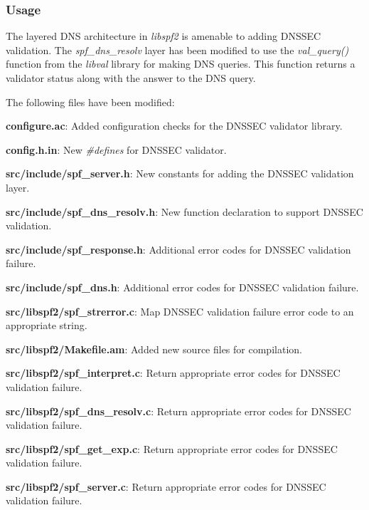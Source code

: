 \documentclass[12pt]{article}
\newcommand{\lib}[1]{{\em #1}}
\newcommand{\path}[1]{{\bf #1}}
\begin{document}

\subsubsection{Usage}

The layered DNS architecture in \lib{libspf2} is amenable to adding DNSSEC
validation.  The {\it spf\_\-dns\_\-resolv} layer has been modified to use
the {\it val\_query()} function from the \lib{libval} library for making
DNS queries.  This function returns a validator status along with the answer
to the DNS query.

The following files have been modified:
\begin{description}
\item{\path{configure.ac}}:
Added configuration checks for the DNSSEC validator library.

\item{\path{config.h.in}}:
New {\it \#defines} for DNSSEC validator.

\item{\path{src/include/spf\_server.h}}:
New constants for adding the DNSSEC validation layer.

\item{\path{src/include/spf\_dns\_resolv.h}}:
New function declaration to support DNSSEC validation.

\item{\path{src/include/spf\_response.h}}:
Additional error codes for DNSSEC validation failure.

\item{\path{src/include/spf\_dns.h}}:
Additional error codes for DNSSEC validation failure.

\item{\path{src/libspf2/spf\_strerror.c}}:
Map DNSSEC validation failure error code to an appropriate string.

\item{\path{src/libspf2/Makefile.am}}:
Added new source files for compilation.

\item{\path{src/libspf2/spf\_interpret.c}}:
Return appropriate error codes for DNSSEC validation failure.

\item{\path{src/libspf2/spf\_dns\_resolv.c}}:
Return appropriate error codes for DNSSEC validation failure.

\item{\path{src/libspf2/spf\_get\_exp.c}}:
Return appropriate error codes for DNSSEC validation failure.

\item{\path{src/libspf2/spf\_server.c}}:
Return appropriate error codes for DNSSEC validation failure.

\end{description}
\end{document}
